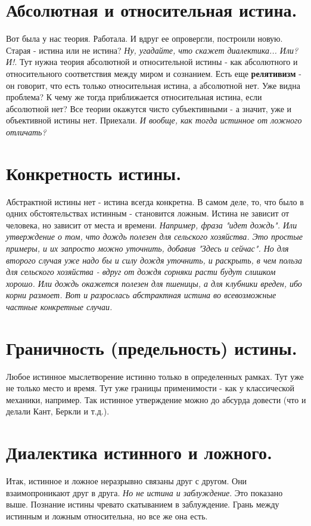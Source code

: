 \section{ Абсолютная и относительная истина.}
Вот была у нас теория. Работала. И вдруг ее опровергли, построили новую. Старая - истина или не истина? \textit{Ну, угадайте, что скажет диалектика... Или? И!}. Тут нужна теория абсолютной и относительной истины - как абсолютного и относительного соответствия между миром и сознанием. Есть еще \textbf{релятивизм} - он говорит, что есть только относительная истина, а абсолютной нет. Уже видна проблема? К чему же тогда приближается относительная истина, если абсолютной нет? Все теории окажутся чисто субъективными - а значит, уже и объективной истины нет. Приехали. \textit{И вообще, как тогда истинное от ложного отличать?}

\section{ Конкретность истины.}
Абстрактной истины нет - истина всегда конкретна. В самом деле, то, что было в одних обстоятельствах истинным - становится ложным. Истина не зависит от человека, но зависит от места и времени. \textit{Например, фраза "идет дождь". Или утверждение о том, что дождь полезен для сельского хозяйства. Это простые примеры, и их запросто можно уточнить, добавив "Здесь и сейчас". Но для второго случая уже надо бы и силу дождя уточнить, и раскрыть, в чем польза для сельского хозяйства - вдруг от дождя сорняки расти будут слишком хорошо. Или дождь окажется полезен для пшеницы, а для клубники вреден, ибо корни размоет. Вот и разрослась абстрактная истина во всевозможные частные конкретные случаи.}

\section{ Граничность (предельность) истины.}
Любое истинное мыслетворение истинно только в определенных рамках. Тут уже не только место и время. Тут уже границы применимости - как у классической механики, например. Так истинное утверждение можно до абсурда довести (что и делали Кант, Беркли и т.д.).

\section{ Диалектика истинного и ложного.}
Итак, истинное и ложное неразрывно связаны друг с другом. Они взаимопроникают друг в друга. \textit{Но не истина и заблуждение}. Это показано выше. Познание истины чревато скатыванием в заблуждение. Грань между истинным и ложным относительна, но все же она есть.

